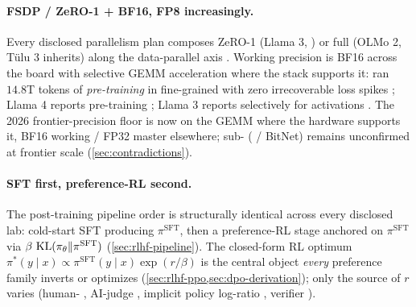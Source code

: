 \paragraph{FSDP / ZeRO-1 + BF16, FP8 increasingly.}
Every disclosed parallelism plan composes ZeRO-1 (Llama 3, )
or full  (OLMo 2, Tülu 3 inherits) along the data-parallel axis
\citep[\S 2.1.2]{torchtitan2024}. Working precision is BF16 across
the board with selective  GEMM acceleration where the stack
supports it:  ran $14.8$T tokens of \emph{pre-training}
in fine-grained  with zero irrecoverable loss spikes
\citep[abstract]{deepseek-v3}; Llama 4 reports  pre-training
\citep{meta-llama4}; Llama 3 reports  selectively for activations
\citep{meta-llama3}. The 2026 frontier-precision floor is now  on
the GEMM where the hardware supports it, BF16 working / FP32 master
elsewhere; sub- ( / BitNet) remains unconfirmed at frontier
scale (\cref{sec:contradictions}).

\paragraph{SFT first, preference-RL second.}
The post-training pipeline order is structurally identical across
every disclosed lab: cold-start SFT \citep{ouyang2022-instructgpt}
producing $\pi^{\mathrm{SFT}}$, then a preference-RL stage anchored
on $\pi^{\mathrm{SFT}}$ via $\beta\,\operatorname{KL}(\pi_\theta \| \pi^{\mathrm{SFT}})$
(\cref{sec:rlhf-pipeline}). The closed-form RL optimum
$\pi^*(y \mid x) \propto \pi^{\mathrm{SFT}}(y \mid x) \exp(r / \beta)$
is the central object \emph{every} preference family inverts or
optimizes (\cref{sec:rlhf-ppo,sec:dpo-derivation}); only the source
of $r$ varies (human- \citep{ouyang2022-instructgpt}, AI-judge
\citep{bai2022-cai}, implicit policy log-ratio \citep{rafailov2023-dpo},
verifier \citep{shao2024}).

